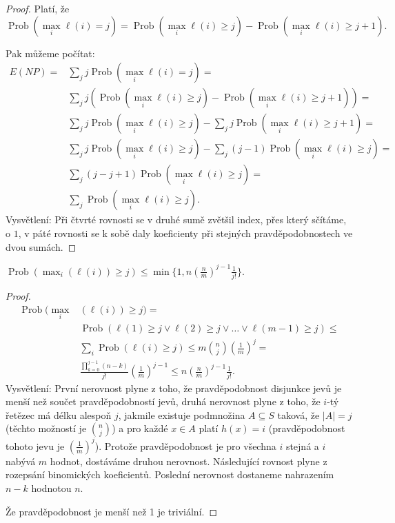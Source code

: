 \documentclass[a4paper,12pt]{article}
\DeclareMathOperator*{\Prob}{Prob}
\begin{document}
\begin{proof}
Platí, že
$$\Prob(\max_i\ell (i)=j)=\Prob(\max_i\ell (i)\ge j)-\Prob(\max_i
\ell (i)\ge j+1).$$

Pak můžeme počítat:
\begin{align*} E(NP)=&\sum_jj\Prob(\max_i\ell (i)=j)=\\
&\sum_jj(\Prob(\max_i\ell (i)\ge j)-\Prob(\max_i\ell (i)\ge j+1))
=\\
&\sum_jj\Prob(\max_i\ell (i)\ge j)-\sum_jj\Prob(\max_i\ell (i)\ge 
j+1)=\\
&\sum_jj\Prob(\max_i\ell (i)\ge j)-\sum_j(j-1)\Prob(\max_i\ell (i
)\ge j)=\\
&\sum_j(j-j+1)\Prob(\max_i\ell (i)\ge j)=\\
&\sum_j\Prob(\max_i\ell (i)\ge j).\end{align*}
Vysvětlení: Při čtvrté rovnosti se v druhé sumě zvětšil 
index, přes který sčítáme, o $1$, v páté rovnosti se k sobě 
daly koeficienty při stejných pravděpodobnostech ve dvou 
sumách. 

\end{proof}

\begin{lemma}
$\Prob(\max_i(\ell (i))\ge j)\le\min\{1,n(\frac nm)^{j-1}\frac 1{
j!}\}.$
\end{lemma}

\begin{proof}
\begin{align*}\Prob(\max_i&(\ell (i))\ge j)=\\
&\Prob(\ell (1)\ge j\vee\ell (2)\ge j\vee\dots\vee\ell (m-1)\ge j
)\le\\
&\sum_i\Prob(\ell (i)\ge j)\le m\binom nj(\frac 1m)^j=\\
&\frac {\prod_{k=0}^{j-1}(n-k)}{j!}(\frac 1m)^{j-1}\le n(\frac nm
)^{j-1}\frac 1{j!}.\end{align*}
Vysvětlení:  První nerovnost plyne z toho, že 
pravděpodobnost disjunkce jevů je menší než 
součet pravděpodobností jevů, dru\-há nerovnost 
plyne z toho, že $i$-tý řetězec má délku alespoň $
j$, jakmile existuje 
podmnožina $A\subseteq S$ taková, že $|A|=j$ (těchto možností je $\binom 
nj$) a pro každé $x\in A$ platí $h(x)=i$ (pravděpo\-dob\-nost 
tohoto jevu je $(\frac 1m)^j$). Protože pravděpodobnost je pro všechna $i$ stejná a $i$ nabývá $m$ hodnot, dostáváme druhou nerovnost. Následující rovnost plyne z rozepsání binomických koeficientů. Poslední nerovnost dostane\-me nahrazením $n-k$ hodnotou $n$.

Že pravděpodobnost je menší než 1 je triviální.

\end{proof}
\end{document}
